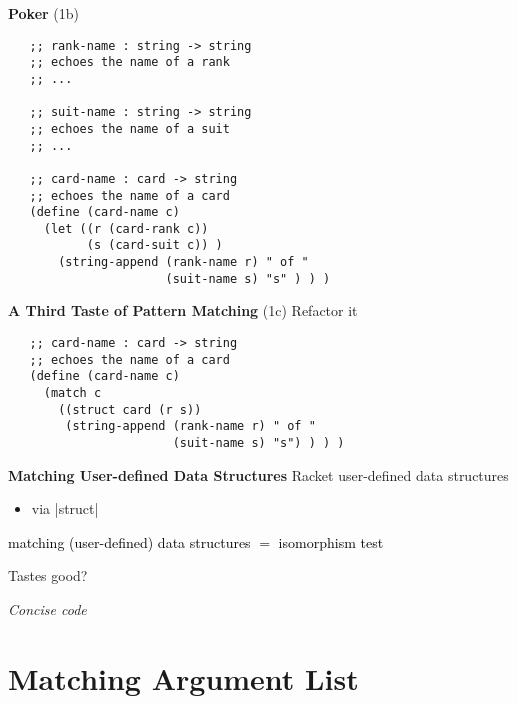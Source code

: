 \documentclass[12pt]{beamer}
\newcommand{\hl}[1]{\textcolor{black}{#1}}
\begin{document}
\begin{frame}[fragile]{{\bf Poker} (1b)}\
 {\footnotesize
  \begin{verbatim}
   ;; rank-name : string -> string
   ;; echoes the name of a rank
   ;; ...

   ;; suit-name : string -> string
   ;; echoes the name of a suit
   ;; ...

   ;; card-name : card -> string
   ;; echoes the name of a card
   (define (card-name c)
     (let ((r (card-rank c))
           (s (card-suit c)) )
       (string-append (rank-name r) " of "
                      (suit-name s) "s" ) ) )
  \end{verbatim}
 }
\end{frame}

\begin{frame}[fragile]{{\bf A Third Taste of Pattern Matching} (1c)}
 Refactor it
 {\footnotesize
  \begin{verbatim}
   ;; card-name : card -> string
   ;; echoes the name of a card
   (define (card-name c)
     (match c
       ((struct card (r s))
        (string-append (rank-name r) " of "
                       (suit-name s) "s") ) ) )
  \end{verbatim}
 }
\end{frame}

\begin{frame}{\bf Matching User-defined Data Structures}
 Racket user-defined data structures
 \begin{itemize}
  \item via |struct|
 \end{itemize}

 \pause

 \hl{matching (user-defined) data structures $=$ isomorphism test}
\end{frame}

\begin{frame}[plain]
 \begin{center}
  {\LARGE
   Tastes good?
   
   \pause

   \em
   Concise code
  }
 \end{center}
\end{frame}

\section{Matching Argument List}
\end{document}
